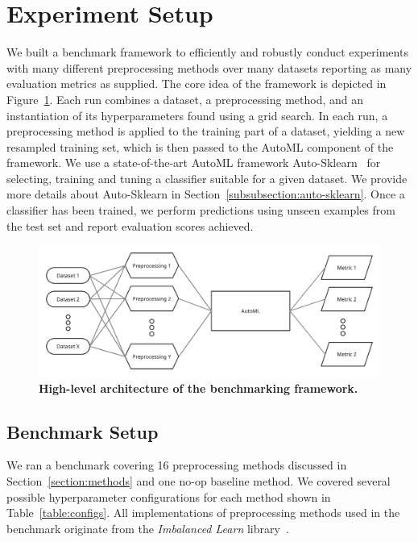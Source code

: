 \documentclass[conference]{IEEEtran}
\begin{document}
\section{Experiment Setup}
\label{section:setup}

We built a benchmark framework to efficiently and robustly conduct experiments with many different
preprocessing methods over many datasets reporting as many evaluation metrics as supplied. The core
idea of the framework is depicted in Figure~\ref{figure:framework}. Each run combines a dataset, a
preprocessing method, and an instantiation of its hyperparameters found using a grid search. In
each run, a preprocessing method is applied to the training part of a dataset, yielding a new
resampled training set, which is then passed to the AutoML component of the framework. We use a
state-of-the-art AutoML framework Auto-Sklearn~\cite{auto-sklearn-1.0} for selecting, training and
tuning a classifier suitable for a given dataset. We provide more details about Auto-Sklearn in
Section~\ref{subsubsection:auto-sklearn}. Once a classifier has been trained, we perform
predictions using unseen examples from the test set and report evaluation scores achieved.

\begin{figure}
    \centering
    \includegraphics[width=\linewidth]{plots/diagram.png}
    \caption{\textbf{High-level architecture of the benchmarking framework.}}
    \label{figure:framework}
\end{figure}


\subsection{Benchmark Setup}

We ran a benchmark covering 16 preprocessing methods discussed in Section~\ref{section:methods} and
one no-op baseline method. We covered several possible hyperparameter configurations for each
method shown in Table~\ref{table:configs}. All implementations of preprocessing methods used in the
benchmark originate from the \emph{Imbalanced Learn} library~\cite{imblearn}.
\end{document}
